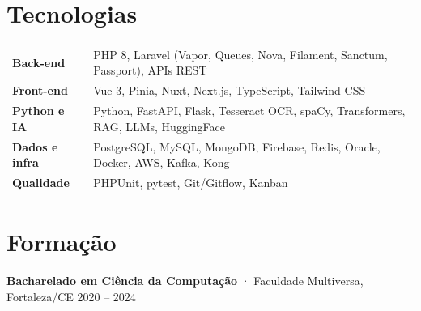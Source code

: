 \documentclass[10pt,a4paper]{article}
\begin{document}
\section{Tecnologias}
\begin{tabularx}{\linewidth}{@{}l X@{}}
\textbf{Back-end} & PHP 8, Laravel (Vapor, Queues, Nova, Filament, Sanctum, Passport), APIs REST \\
\textbf{Front-end} & Vue 3, Pinia, Nuxt, Next.js, TypeScript, Tailwind CSS \\
\textbf{Python e IA} & Python, FastAPI, Flask, Tesseract OCR, spaCy, Transformers, RAG, LLMs, HuggingFace \\
\textbf{Dados e infra} & PostgreSQL, MySQL, MongoDB, Firebase, Redis, Oracle, Docker, AWS, Kafka, Kong \\
\textbf{Qualidade} & PHPUnit, pytest, Git/Gitflow, Kanban \\
\end{tabularx}

\section{Formação}
\textbf{Bacharelado em Ciência da Computação} · Faculdade Multiversa, Fortaleza/CE \hfill {\color{muted}\small 2020 -- 2024}
\end{document}
